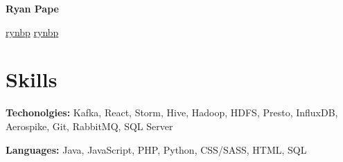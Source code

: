 \documentclass[letterpaper,11pt]{article}
\newcommand{\contactspace}{\hspace{9pt}}
\begin{document}
\centerline{\huge \textbf{Ryan Pape}}
\vspace{3pt}
\centerline{\href{https://linkedin.com/in/rynbp}{\faLinkedin \space rynbp} \contactspace \href{https://github.com/rynbp}{\faGithub \space rynbp}}

\section{Skills}
  \begin{minipage}[t]{0.6\linewidth}
    {\bfseries Techonolgies:} Kafka, React, Storm, Hive, Hadoop, HDFS, Presto, InfluxDB, Aerospike, Git, RabbitMQ, SQL Server
  \end{minipage}
  \hspace{0.04\linewidth}
  \begin{minipage}[t]{0.35\linewidth}
    {\bfseries Languages:} Java, JavaScript, PHP, Python, CSS/SASS, HTML, SQL
  \end{minipage}

\end{document}
